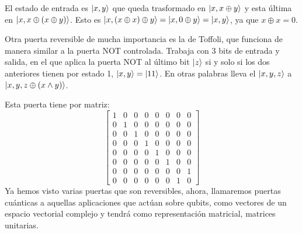 \documentclass[a4paper]{article}
\numberwithin{equation}{section}
\begin{document}
\begin{figure}[h]
\centering
{}
\end{figure}

El estado de entrada es $\ket{x, y}$ que queda trasformado en $\ket{x, x\oplus y}$ y esta última en $\ket{x, x\oplus (x\oplus y)}$. Esto es $\ket{x, (x\oplus x) \oplus y} = \ket{x, 0\oplus y} = \ket{x, y}$, ya que $x\oplus x = 0$.

Otra puerta reversible de mucha importancia es la de Toffoli,
que funciona de manera similar a la puerta NOT controlada. Trabaja con 3 bits de entrada y salida, en el que aplica la puerta NOT al último bit $\ket{z}$ si y solo si los dos anteriores tienen por estado 1, $\ket{x, y} = \ket{11}$. En otras palabras lleva el $\ket{x,y,z}$ a $\ket{x,y,z\oplus(x\wedge y)}$. \\
\begin{figure}[h]
\centering
{}
\end{figure}

Esta puerta tiene por matriz:
\begin{equation}
\begin{bmatrix}
1 & 0 & 0 & 0 & 0 & 0 & 0 & 0 \\
0 & 1 & 0 & 0 & 0 & 0 & 0 & 0 \\
0 & 0 & 1 & 0 & 0 & 0 & 0 & 0 \\
0 & 0 & 0 & 1 & 0 & 0 & 0 & 0 \\
0 & 0 & 0 & 0 & 1 & 0 & 0 & 0 \\
0 & 0 & 0 & 0 & 0 & 1 & 0 & 0 \\
0 & 0 & 0 & 0 & 0 & 0 & 0 & 1 \\
0 & 0 & 0 & 0 & 0 & 0 & 1 & 0
\end{bmatrix}
\end{equation}
Ya hemos visto varias puertas que son reversibles, ahora, llamaremos puertas cuánticas a aquellas aplicaciones que actúan sobre qubits, como vectores de un espacio vectorial complejo y tendrá como representación matricial, matrices unitarias.
\end{document}
